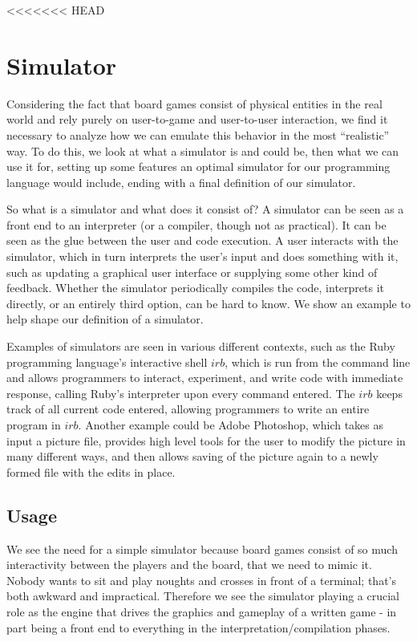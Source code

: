 <<<<<<< HEAD
\section{Simulator} Considering the fact that board games consist of
physical entities in the real world and rely purely on user-to-game
and user-to-user interaction, we find it necessary to analyze how we
can emulate this behavior in the most ``realistic'' way. To do this,
we look at what a simulator is and could be, then what we can use it
for, setting up some features an optimal simulator for our programming
language would include, ending with a final definition of our simulator.

So what is a simulator and what does it consist of? A simulator can
be seen as a front end to an interpreter (or a compiler, though not
as practical). It can be seen as the glue between the user and code
execution. A user interacts with the simulator, which in turn interprets
the user's input and does something with it, such as updating a
graphical user interface or supplying some other kind of feedback.
Whether the simulator periodically compiles the code, interprets it
directly, or an entirely third option, can be hard to know. We show an
example to help shape our definition of a simulator.

Examples of simulators are seen in various different contexts, such as
the Ruby\cite{rubyLang} programming language's interactive shell $irb$,
which is run from the command line and allows programmers to interact,
experiment, and write code with immediate response, calling Ruby's
interpreter upon every command entered. The $irb$ keeps track of all
current code entered, allowing programmers to write an entire program in
$irb$. Another example could be Adobe\textsuperscript{\textregistered}
Photoshop\textsuperscript{\textregistered}, which takes as input a
picture file, provides high level tools for the user to modify the
picture in many different ways, and then allows saving of the picture
again to a newly formed file with the edits in place.

\subsection{Usage} We see the need for a simple simulator because board
games consist of so much interactivity between the players and the
board, that we need to mimic it. Nobody wants to sit and play noughts
and crosses in front of a terminal; that's both awkward and impractical.
Therefore we see the simulator playing a crucial role as the engine that
drives the graphics and gameplay of a written game - in part being a
front end to everything in the interpretation/compilation phases.

